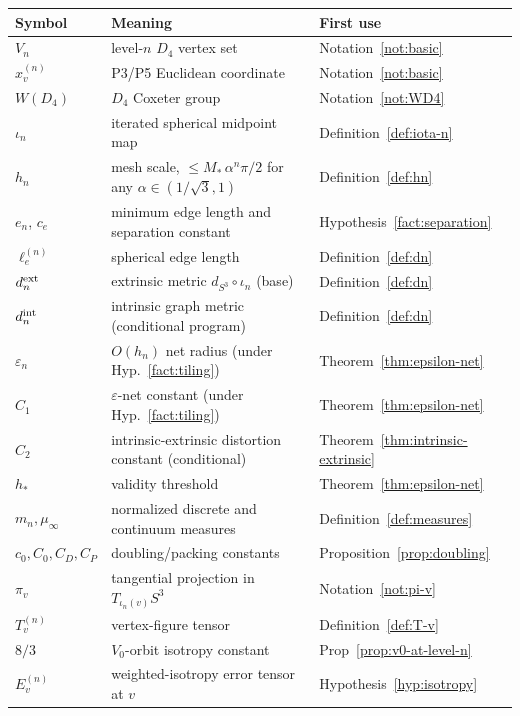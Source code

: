 \documentclass[11pt, a4paper]{amsart}
\theoremstyle{definition}
\newcommand{\dsph}{d_{S^3}}
\begin{document}
\begin{center}
\begin{tabular}{|l|l|l|}
\hline
Symbol & Meaning & First use \\
\hline
$V_n$ & level-$n$ $D_4$ vertex set &
  Notation~\ref{not:basic} \\
$x_v^{(n)}$ & P3/P5 Euclidean coordinate &
  Notation~\ref{not:basic} \\
$W(D_4)$ & $D_4$ Coxeter group & Notation~\ref{not:WD4} \\
$\iota_n$ & iterated spherical midpoint map &
  Definition~\ref{def:iota-n} \\
$h_n$ & mesh scale, $\leq M_\ast\,\alpha^n \pi/2$ for any $\alpha \in (1/\sqrt{3}, 1)$ &
  Definition~\ref{def:hn} \\
$e_n$, $c_e$ & minimum edge length and separation constant &
  Hypothesis~\ref{fact:separation} \\
$\ell_e^{(n)}$ & spherical edge length &
  Definition~\ref{def:dn} \\
$d_n^{\rm ext}$ & extrinsic metric $\dsph \circ \iota_n$ (base) &
  Definition~\ref{def:dn} \\
$d_n^{\rm int}$ & intrinsic graph metric (conditional program) &
  Definition~\ref{def:dn} \\
$\varepsilon_n$ & $O(h_n)$ net radius (under Hyp.~\ref{fact:tiling}) &
  Theorem~\ref{thm:epsilon-net} \\
$C_1$ & $\varepsilon$-net constant (under Hyp.~\ref{fact:tiling}) &
  Theorem~\ref{thm:epsilon-net} \\
$C_2$ & intrinsic-extrinsic distortion constant (conditional) &
  Theorem~\ref{thm:intrinsic-extrinsic} \\
$h_\ast$ & validity threshold & Theorem~\ref{thm:epsilon-net} \\
$m_n, \mu_\infty$ & normalized discrete and continuum measures &
  Definition~\ref{def:measures} \\
$c_0, C_0, C_D, C_P$ & doubling/packing constants &
  Proposition~\ref{prop:doubling} \\
$\pi_v$ & tangential projection in $T_{\iota_n(v)} S^3$ &
  Notation~\ref{not:pi-v} \\
$T_v^{(n)}$ & vertex-figure tensor &
  Definition~\ref{def:T-v} \\
$8/3$ & $V_0$-orbit isotropy constant &
  Prop~\ref{prop:v0-at-level-n} \\
$E_v^{(n)}$ & weighted-isotropy error tensor at $v$ &
  Hypothesis~\ref{hyp:isotropy} \\

\end{tabular}
\end{center}
\end{document}
